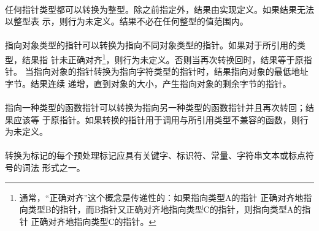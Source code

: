 {\paragraph{}
任何指针类型都可以转换为整型。除之前指定外，结果由实现定义。如果结果无法以整型表
示，则行为未定义。结果不必在任何整型的值范围内。

\paragraph{}
指向对象类型的指针可以转换为指向不同对象类型的指针。如果对于所引用的类型，结果指
针未正确对齐\footnote{通常，``正确对齐''这个概念是传递性的：如果指向类型A的指针
正确对齐地指向类型B的指针，而B指针又正确对齐地指向类型C的指针，则指向类型A的指针
正确对齐地指向类型C的指针。}，则行为未定义。否则当再次转换回时，结果等于原指针。
当指向对象的指针转换为指向字符类型的指针时，结果指向对象的最低地址字节。结果连续
递增，直到对象的大小，产生指向对象的剩余字节的指针。

\paragraph{}
指向一种类型的函数指针可以转换为指向另一种类型的函数指针并且再次转回；结果应该等
于原指针。如果转换的指针用于调用与所引用类型不兼容的函数，则行为未定义。


\syntax
\paragraph{}

\constraint
\paragraph{}
转换为标记的每个预处理标记应具有关键字、标识符、常量、字符串文本或标点符号的词法
形式之一。

\semantic
}
